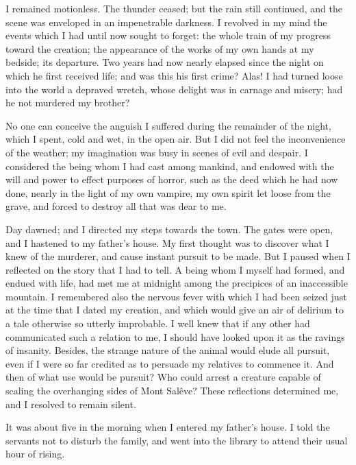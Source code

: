 \documentclass[12pt,openright]{book}
\begin{document}
I remained motionless. The thunder ceased; but the rain still continued, and the scene was enveloped in an impenetrable darkness. I revolved in my mind the events which I had until now sought to forget: the whole train of my progress toward the creation; the appearance of the works of my own hands at my bedside; its departure. Two years had now nearly elapsed since the night on which he first received life; and was this his first crime? Alas! I had turned loose into the world a depraved wretch, whose delight was in carnage and misery; had he not murdered my brother?

No one can conceive the anguish I suffered during the remainder of the night, which I spent, cold and wet, in the open air. But I did not feel the inconvenience of the weather; my imagination was busy in scenes of evil and despair. I considered the being whom I had cast among mankind, and endowed with the will and power to effect purposes of horror, such as the deed which he had now done, nearly in the light of my own vampire, my own spirit let loose from the grave, and forced to destroy all that was dear to me.

Day dawned; and I directed my steps towards the town. The gates were open, and I hastened to my father’s house. My first thought was to discover what I knew of the murderer, and cause instant pursuit to be made. But I paused when I reflected on the story that I had to tell. A being whom I myself had formed, and endued with life, had met me at midnight among the precipices of an inaccessible mountain. I remembered also the nervous fever with which I had been seized just at the time that I dated my creation, and which would give an air of delirium to a tale otherwise so utterly improbable. I well knew that if any other had communicated such a relation to me, I should have looked upon it as the ravings of insanity. Besides, the strange nature of the animal would elude all pursuit, even if I were so far credited as to persuade my relatives to commence it. And then of what use would be pursuit? Who could arrest a creature capable of scaling the overhanging sides of Mont Salêve? These reflections determined me, and I resolved to remain silent.

It was about five in the morning when I entered my father’s house. I told the servants not to disturb the family, and went into the library to attend their usual hour of rising.
\end{document}
